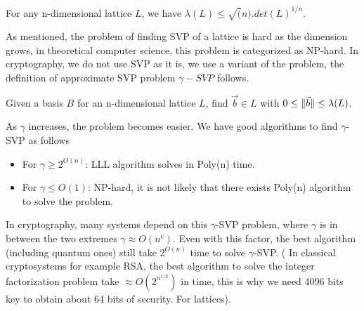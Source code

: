 \begin{description}
\begin{description}
\begin{definition}
\[                \]
                \label{def:minLattice}
            \end{definition}
            \begin{theorem}
                For any n-dimensional lattice $L$, we have $\lambda(L) \leq
                \sqrt(n).det(L)^{1/n}$.
                \label{the:minkowski1}
            \end{theorem}
            As mentioned, the problem of finding SVP of a lattice is hard as the
            dimension grows, in theoretical computer science, this problem is
            categorized as NP-hard. In cryptography, we do not use SVP as it is,
            we use a variant of the problem, the definition of approximate SVP
            problem $\gamma-SVP$
            follows.
            \begin{definition}
                Given a basis $B$ for an n-dimensional lattice $L$, find
                $\vec{b} \in L$ with $0 \leq \Vert \vec{b} \Vert \leq \lambda(L)$.
                \label{def:gammaSVP}
            \end{definition}
            As $\gamma$ increases, the problem becomes easier. We have good
            algorithms to find $\gamma$-SVP as follows
            \begin{itemize}
                \item For $\gamma \geq 2^{O(n)}$: LLL algorithm solves in Poly(n)
                    time.
                \item For $\gamma \leq O(1)$: NP-hard, it is not likely that
                    there exists Poly(n) algorithm to solve the problem.
            \end{itemize}
            In cryptography, many systems depend on this $\gamma$-SVP problem,
            where $\gamma$ is in between the two extremes $\gamma \approx
            O(n^c)$. Even with this factor, the best algorithm (including
            quantum ones) still take
            $2^{O(n)}$ time to solve $\gamma$-SVP. ( In classical cryptosystems
                for example RSA, the best algorithm to solve the integer
                factorization problem take $\approx O(2^{n^{1/2}})$ in time,
                this is why we
                need 4096 bits key to obtain about 64 bits of security. For
                lattices).
        \end{description}
\end{description}
